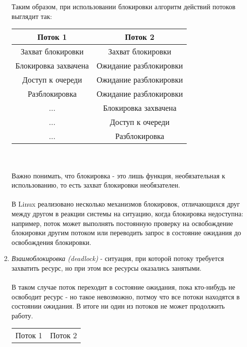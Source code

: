 \begin{enumerate}
    \\\\
    Таким образом, при использовании блокировки алгоритм действий потоков выглядит так:
    \begin{center}
        \begin{tabular}{||c c||} 
            \hline
            Поток 1 & Поток 2 \\ [0.5ex] 
            \hline\hline
            Захват блокировки & Захват блокировки \\ 
            \hline
            Блокировка захвачена & Ожидание разблокировки \\
            \hline
            Доступ к очереди & Ожидание разблокировки \\
            \hline
            Разблокировка & Ожидание разблокировки \\
            \hline
            ... & Блокировка захвачена \\
            \hline
            ... & Доступ к очереди \\
            \hline
            ... & Разблокировка \\[1ex] 
            \hline
        \end{tabular}
    \end{center}
    \\\\
    Важно понимать, что блокировка - это лишь функция, необязательная к использованию, то есть захват блокировки необязателен. 
    \\\\
    В Linux реализовано несколько механизмов блокировок, отличающихся друг между другом в реакции системы на ситуацию, когда блокировка недоступна: например, поток может выполнять постоянную проверку на освобождение блокировки другим потоком или переводить запрос в состояние ожидания до освобождения блокировки.
    \item \textit{Взаимоблокировка (deadlock)} - ситуация, при которой потоку требуется захватить ресурс, но при этом все ресурсы оказались занятыми.
    \\\\
    В таком случае поток переходит в состояние ожидания, пока кто-нибудь не освободит ресурс - но такое невозможно, потмоу что все потоки находятся в состоянии ожидания. В итоге ни один из потоков не может продолжить работу.
     \begin{center}
        \begin{tabular}{||c c||} 
            \hline
            Поток 1 & Поток 2 \\ [0.5ex] 

\end{tabular}
\end{center}
\end{enumerate}
